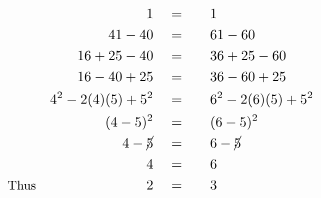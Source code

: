 \begin{alignat*}{5}
&\,&1\quad&=\quad&&1\\
&\,&41-40\quad&=&&61-60\\
&\,&16+25-40\quad&=&&36+25-60\\
&\,&16-40+25\quad&=&&36-60+25\\
&\,&4^2-2(4)(5)+5^2\quad&=&&6^2-2(6)(5)+5^2\\
&\,&(4-5)^2\quad&=&&(6-5)^2\\
&\,&4-\cancel{5}\quad&=&&6-\cancel{5}\\
&\,&4\quad&=&&6\\
&\small\text{Thus}&2\quad&=&&3\\
\end{alignat*}

